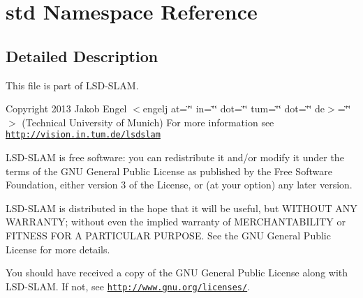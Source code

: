 \hypertarget{namespacestd}{\section{std Namespace Reference}
\label{namespacestd}
}


\subsection{Detailed Description}
This file is part of L\-S\-D-\/\-S\-L\-A\-M.

Copyright 2013 Jakob Engel $<$engelj at=\char`\"{}\char`\"{} in=\char`\"{}\char`\"{} dot=\char`\"{}\char`\"{} tum=\char`\"{}\char`\"{} dot=\char`\"{}\char`\"{} de$>$=\char`\"{}\char`\"{}$>$ (Technical University of Munich) For more information see \href{http://vision.in.tum.de/lsdslam}{\tt http\-://vision.\-in.\-tum.\-de/lsdslam}

L\-S\-D-\/\-S\-L\-A\-M is free software\-: you can redistribute it and/or modify it under the terms of the G\-N\-U General Public License as published by the Free Software Foundation, either version 3 of the License, or (at your option) any later version.

L\-S\-D-\/\-S\-L\-A\-M is distributed in the hope that it will be useful, but W\-I\-T\-H\-O\-U\-T A\-N\-Y W\-A\-R\-R\-A\-N\-T\-Y; without even the implied warranty of M\-E\-R\-C\-H\-A\-N\-T\-A\-B\-I\-L\-I\-T\-Y or F\-I\-T\-N\-E\-S\-S F\-O\-R A P\-A\-R\-T\-I\-C\-U\-L\-A\-R P\-U\-R\-P\-O\-S\-E. See the G\-N\-U General Public License for more details.

You should have received a copy of the G\-N\-U General Public License along with L\-S\-D-\/\-S\-L\-A\-M. If not, see \href{http://www.gnu.org/licenses/}{\tt http\-://www.\-gnu.\-org/licenses/}. 